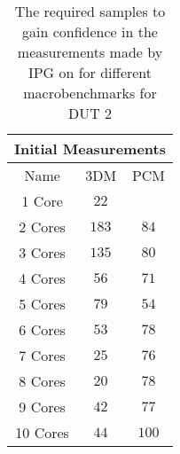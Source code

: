 \begin{table}[H]
    \centering
    \begin{tabular}{|| c | c | c ||}
    \hline
    \multicolumn{3}{||c||}{Initial Measurements} \\ [0.5ex] \hline\hline
    Name & 3DM & PCM \\\hline
    1 Core& $22$ &  \\
    2 Cores& $183$ & $84$ \\
    3 Cores& $135$ & $80$ \\
    4 Cores& $56$ & $71$ \\
    5 Cores& $79$ & $54$ \\
    6 Cores& $53$ & $78$ \\
    7 Cores& $25$ & $76$ \\
    8 Cores& $20$ & $78$ \\
    9 Cores& $42$ & $77$ \\
    10 Cores& $44$ & $100$ \\\hline
    \end{tabular}
    \caption{The required samples to gain confidence in the measurements made by IPG on for different macrobenchmarks for DUT 2}
    \label{tab:initial-measurements-exp-3-dut-2-app}
\end{table}
